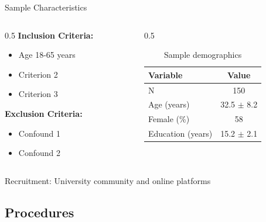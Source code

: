 \documentclass[aspectratio=169,11pt]{beamer}
\begin{document}
\begin{frame}{Sample Characteristics}
  \begin{columns}[T]

    \begin{column}{0.5\textwidth}
      \textbf{Inclusion Criteria:}
      \begin{itemize}
        \item Age 18-65 years
        \item Criterion 2
        \item Criterion 3
      \end{itemize}

      \vspace{0.3cm}

      \textbf{Exclusion Criteria:}
      \begin{itemize}
        \item Confound 1
        \item Confound 2
      \end{itemize}
    \end{column}

    \begin{column}{0.5\textwidth}
      \begin{table}
        \centering
        \caption{Sample demographics}
        \small
        \begin{tabular}{lc}
          \toprule
          \textbf{Variable} & \textbf{Value} \\
          \midrule
          N & 150 \\
          Age (years) & 32.5 $\pm$ 8.2 \\
          Female (\%) & 58 \\
          Education (years) & 15.2 $\pm$ 2.1 \\
          \bottomrule
        \end{tabular}
      \end{table}
    \end{column}

  \end{columns}

  \vspace{0.3cm}

  \footnotesize Recruitment: University community and online platforms
\end{frame}

\subsection{Procedures}
\end{document}
